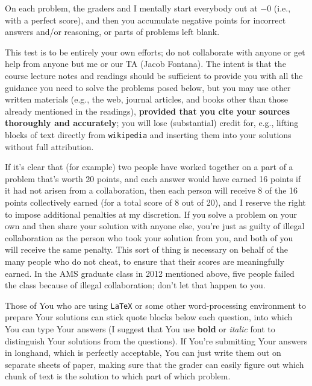 \documentclass[12pt]{article}
\begin{document}
On each problem, the graders and I mentally start everybody out at $-0$ (i.e., with a perfect score), and then you accumulate negative points for incorrect answers and/or reasoning, or parts of problems left blank.

This test is to be entirely your own efforts; do not collaborate with
anyone or get help from anyone but me or our TA (Jacob Fontana). The intent is that the course lecture notes and readings should be sufficient to provide you with all the guidance you need to solve the problems posed below, but you may use other written materials (e.g., the web, journal articles, and books other than those already mentioned in the readings),
\textbf{provided that you cite your sources thoroughly and accurately}; you
will lose (substantial) credit for, e.g., lifting blocks of text directly
from \texttt{wikipedia} and inserting them into your solutions without full
attribution.

If it's clear that (for example) two people have worked together on a part
of a problem that's worth 20 points, and each answer would have earned 16
points if it had not arisen from a collaboration, then each person will
receive 8 of the 16 points collectively earned (for a total score of 8 out
of 20), and I reserve the right to impose additional penalties at my
discretion. If you solve a problem on your own and then share your solution
with anyone else, you're just as guilty of illegal collaboration as
the person who took your solution from you, and both of you will receive
the same penalty. This sort of thing is necessary on behalf of the many
people who do not cheat, to ensure that their scores are meaningfully
earned. In the AMS graduate class in 2012 mentioned above, five people failed the class because of illegal collaboration; don't let that happen to you.

Those of You who are using \texttt{LaTeX} or some other word-processing environment to prepare Your solutions can stick quote blocks below each question, into which You can type Your answers (I suggest that You use \textbf{bold} or \textit{italic} font to distinguish Your solutions from the questions). If You're submitting Your answers in longhand, which is perfectly acceptable, You can just write them out on separate sheets of paper, making sure that the grader can easily figure out which chunk of text is the solution to which part of which problem.
\begin{quote}

\end{quote}
\end{document}
